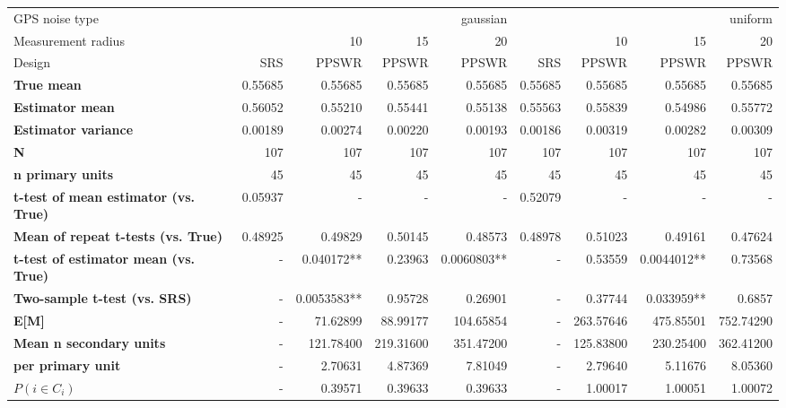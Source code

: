 \begin{tabular}{l|r|rrr|r|rrr}
\toprule
GPS noise type & \multicolumn{4}{r}{gaussian} & \multicolumn{4}{r}{uniform} \\
Measurement radius &  & 10 & 15 & 20 &  & 10 & 15 & 20 \\
Design & SRS & PPSWR & PPSWR & PPSWR & SRS & PPSWR & PPSWR & PPSWR \\
\midrule
\textbf{True mean} &  0.55685 &  0.55685 &  0.55685 &  0.55685 &  0.55685 &  0.55685 &  0.55685 &  0.55685 \\
\textbf{Estimator mean} & 0.56052 & 0.55210 & 0.55441 & 0.55138 & 0.55563 & 0.55839 & 0.54986 & 0.55772 \\
\textbf{Estimator variance} & 0.00189 & 0.00274 & 0.00220 & 0.00193 & 0.00186 & 0.00319 & 0.00282 & 0.00309 \\
\textbf{N} & 107 & 107 & 107 & 107 & 107 & 107 & 107 & 107 \\
\textbf{n primary units} & 45 & 45 & 45 & 45 & 45 & 45 & 45 & 45 \\
\textbf{t-test of mean estimator (vs. True)} & 0.05937 & - & - & - & 0.52079 & - & - & - \\
\textbf{Mean of repeat t-tests (vs. True)} & 0.48925 & 0.49829 & 0.50145 & 0.48573 & 0.48978 & 0.51023 & 0.49161 & 0.47624 \\
\textbf{t-test of estimator mean (vs. True)} & - & 0.040172** & 0.23963 & 0.0060803** & - & 0.53559 & 0.0044012** & 0.73568 \\
\textbf{Two-sample t-test (vs. SRS)} & - & 0.0053583** & 0.95728 & 0.26901 & - & 0.37744 & 0.033959** & 0.6857 \\
\textbf{E[M]} & - & 71.62899 & 88.99177 & 104.65854 & - & 263.57646 & 475.85501 & 752.74290 \\
\textbf{Mean n secondary units} & - & 121.78400 & 219.31600 & 351.47200 & - & 125.83800 & 230.25400 & 362.41200 \\
\textbf{     per primary unit} & - & 2.70631 & 4.87369 & 7.81049 & - & 2.79640 & 5.11676 & 8.05360 \\
\textbf{$P(i \in C_i)$} & - & 0.39571 & 0.39633 & 0.39633 & - & 1.00017 & 1.00051 & 1.00072 \\
\bottomrule
\end{tabular}
